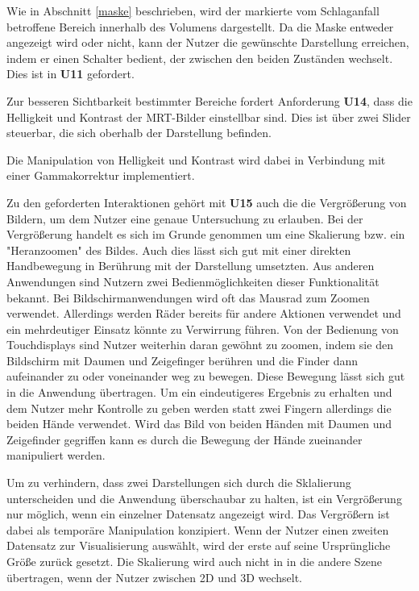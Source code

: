 
Wie in Abschnitt \ref{maske} beschrieben, wird der markierte vom Schlaganfall betroffene Bereich innerhalb des Volumens dargestellt. Da die Maske entweder angezeigt wird oder nicht, kann der Nutzer die gewünschte Darstellung erreichen, indem er einen Schalter bedient, der zwischen den beiden Zuständen wechselt. Dies ist in \textbf{U11} gefordert.

Zur besseren Sichtbarkeit bestimmter Bereiche fordert Anforderung \textbf{U14}, dass die Helligkeit und Kontrast der MRT-Bilder einstellbar sind. Dies ist über zwei Slider steuerbar, die sich oberhalb der Darstellung befinden. 

Die Manipulation von Helligkeit und Kontrast wird dabei in Verbindung mit einer Gammakorrektur implementiert.

Zu den geforderten Interaktionen gehört mit \textbf{U15} auch die die Vergrößerung von Bildern, um dem Nutzer eine genaue Untersuchung zu erlauben. Bei der Vergrößerung handelt es sich im Grunde genommen um eine Skalierung bzw. ein "Heranzoomen" des Bildes. Auch dies lässt sich gut mit einer direkten Handbewegung in Berührung mit der Darstellung umsetzten. Aus anderen Anwendungen sind Nutzern zwei Bedienmöglichkeiten dieser Funktionalität bekannt. Bei Bildschirmanwendungen wird oft das Mausrad zum Zoomen verwendet. Allerdings werden Räder bereits für andere Aktionen verwendet und ein mehrdeutiger Einsatz könnte zu Verwirrung führen. Von der Bedienung von Touchdisplays sind Nutzer weiterhin daran gewöhnt zu zoomen, indem sie den Bildschirm mit Daumen und Zeigefinger berühren und die Finder dann aufeinander zu oder voneinander weg zu bewegen. Diese Bewegung lässt sich gut in die Anwendung übertragen. Um ein eindeutigeres Ergebnis zu erhalten und dem Nutzer mehr Kontrolle zu geben werden statt zwei Fingern allerdings die beiden Hände verwendet. Wird das Bild von beiden Händen mit Daumen und Zeigefinder gegriffen kann es durch die Bewegung der Hände zueinander manipuliert werden.

Um zu verhindern, dass zwei Darstellungen sich durch die Sklalierung unterscheiden und die Anwendung überschaubar zu halten, ist ein Vergrößerung nur möglich, wenn ein einzelner Datensatz angezeigt wird. 
Das Vergrößern ist dabei als temporäre Manipulation konzipiert. Wenn der Nutzer einen zweiten Datensatz zur Visualisierung auswählt, wird der erste auf seine Ursprüngliche Größe zurück gesetzt. Die Skalierung wird auch nicht in in die andere Szene übertragen, wenn der Nutzer zwischen 2D und 3D wechselt.

